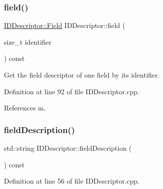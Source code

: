 \hypertarget{class_d_d4hep_1_1_geometry_1_1_i_d_descriptor_a405b5079fa2243dad5a4b6860aba6648}{}\label{class_d_d4hep_1_1_geometry_1_1_i_d_descriptor_a405b5079fa2243dad5a4b6860aba6648} 
\subsubsection{\texorpdfstring{field()}{field()}\hspace{0.1cm}{\footnotesize\ttfamily [2/2]}}
{\footnotesize\ttfamily \hyperlink{class_d_d4hep_1_1_geometry_1_1_i_d_descriptor_ac06f5915e74f8a8f2ff73e9a322556e4}{I\+D\+Descriptor\+::\+Field} I\+D\+Descriptor\+::field (\begin{DoxyParamCaption}\item[{size\+\_\+t}]{identifier }\end{DoxyParamCaption}) const}



Get the field descriptor of one field by its identifier. 



Definition at line 92 of file I\+D\+Descriptor.\+cpp.



References m.

\hypertarget{class_d_d4hep_1_1_geometry_1_1_i_d_descriptor_a5bbbe15fcfb1921bf0cd687e8aa03fb0}{}\label{class_d_d4hep_1_1_geometry_1_1_i_d_descriptor_a5bbbe15fcfb1921bf0cd687e8aa03fb0} 
\subsubsection{\texorpdfstring{field\+Description()}{fieldDescription()}}
{\footnotesize\ttfamily std\+::string I\+D\+Descriptor\+::field\+Description (\begin{DoxyParamCaption}{ }\end{DoxyParamCaption}) const}



Definition at line 56 of file I\+D\+Descriptor.\+cpp.



